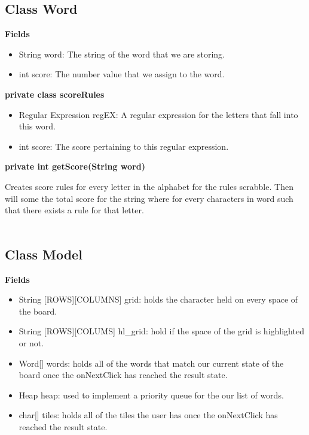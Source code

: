 \documentclass[11pt]{article}
\begin{document}
\subsection{Class Word}
\textbf{Fields\\}
\begin{itemize}
	\item String word: The string of the word that we are storing.
	\item int score: The number value that we assign to the word.
\end{itemize}
%
\textbf{private class scoreRules\\}
\begin{itemize}
	\item Regular Expression regEX: A regular expression for the letters that fall into this word.
	\item int score: The score pertaining to this regular expression.
\end{itemize}
%
\textbf{private int getScore(String word)\\}

Creates score rules for every letter in the alphabet for the rules scrabble. Then will some the total score for the string where for every characters in word such that there exists a rule for that letter.\\\\ 
%
%
\subsection{Class Model}
\textbf{Fields \\}
	
	\begin{itemize}
		\item String  [ROWS][COLUMNS] grid: holds the character held on every space of the board. 
		\item String [ROWS][COLUMS] hl\_grid: hold if the space of the grid is highlighted or not.
		\item Word[] words: holds all of the words that match our current state of the board once the onNextClick has reached the result state.
		\item Heap heap: used to implement a priority queue for the our list of words.
		\item char[] tiles:  holds all of the tiles the user has once the onNextClick has reached the result state.
 
	\end{itemize}
\end{document}
